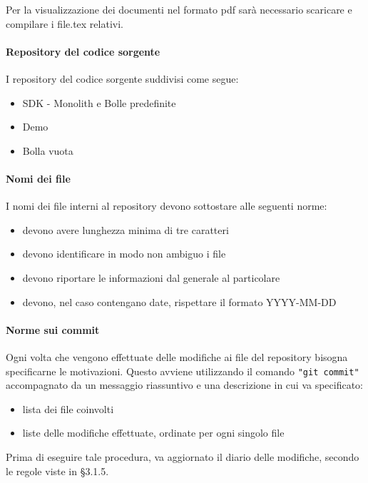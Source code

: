 Per la visualizzazione dei documenti nel formato pdf sarà necessario scaricare e compilare i file.tex relativi.


\paragraph{Repository del codice sorgente}
I  repository del codice sorgente suddivisi come segue:

\begin{itemize}
	\item SDK - Monolith e Bolle predefinite
	\item Demo
	\item Bolla vuota
\end{itemize}

\paragraph{Nomi dei file}  
I nomi dei file interni al repository devono sottostare alle seguenti norme:
\begin{itemize}
	\item devono avere lunghezza minima di tre caratteri
	\item devono identificare in modo non ambiguo i file
	\item devono riportare le informazioni dal generale al particolare
	\item devono, nel caso contengano date, rispettare il formato YYYY-MM-DD
\end{itemize}

\paragraph{Norme sui commit}
Ogni volta che vengono effettuate delle modifiche ai file del
repository bisogna specificarne le motivazioni. Questo avviene utilizzando il comando
\texttt{"git commit"} accompagnato da un messaggio riassuntivo e una descrizione in cui va specificato: 
\begin{itemize}
	\item lista dei file coinvolti
	\item liste delle modifiche effettuate, ordinate per ogni singolo file
\end{itemize}
Prima di eseguire tale procedura, va aggiornato il diario delle modifiche, secondo le regole viste in \S 3.1.5.

\newpage

